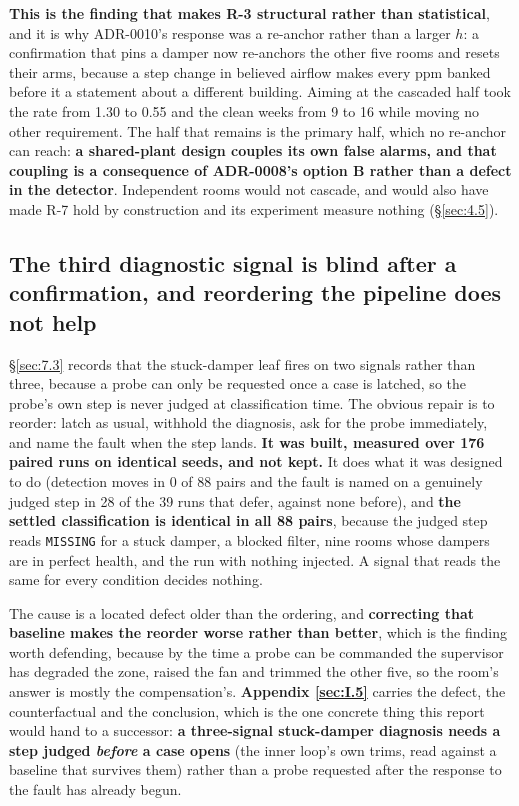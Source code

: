 \textbf{This is the finding that makes R-3 structural rather than statistical}, and it is why
ADR-0010's response was a re-anchor rather than a larger $h$: a confirmation that pins a damper now
re-anchors the other five rooms and resets their arms, because a step change in believed airflow
makes every ppm banked before it a statement about a different building. Aiming at the cascaded half
took the rate from 1.30 to 0.55 and the clean weeks from 9 to 16 while moving no other requirement.
The half that remains is the primary half, which no re-anchor can reach: \textbf{a shared-plant
design couples its own false alarms, and that coupling is a consequence of ADR-0008's option B
rather than a defect in the detector}. Independent rooms would not cascade, and would also have made
R-7 hold by construction and its experiment measure nothing (§\ref{sec:4.5}).

\subsection{The third diagnostic signal is blind after a confirmation, and reordering the
pipeline does not help}\label{sec:13.6}
§\ref{sec:7.3} records that the stuck-damper leaf fires on two signals rather than three, because a probe can
only be requested once a case is latched, so the probe's own step is never judged at
classification time. The obvious repair is to reorder: latch as usual, withhold the diagnosis, ask for the probe immediately,
and name the fault when the step lands. \textbf{It was built, measured over 176 paired runs on
identical seeds, and not kept.} It does what it was designed to do (detection moves in 0 of 88
pairs and the fault is named on a genuinely judged step in 28 of the 39 runs that defer, against none
before), and \textbf{the settled classification is identical in all 88 pairs}, because the judged
step reads \texttt{MISSING} for a stuck damper, a blocked filter, nine rooms whose dampers are in
perfect health, and the run with nothing injected. A signal that reads the same for every condition
decides nothing.

The cause is a located defect older than the ordering, and \textbf{correcting that baseline makes the
reorder worse rather than better}, which is the finding worth defending, because by the time a
probe can be commanded the supervisor has degraded the zone, raised the fan and trimmed the other
five, so the room's answer is mostly the compensation's. \textbf{Appendix \ref{sec:I.5}} carries the defect, the
counterfactual and the conclusion, which is the one concrete thing this report would hand to a
successor: \textbf{a three-signal stuck-damper diagnosis needs a step judged \emph{before} a case
opens} (the inner loop's own trims, read against a baseline that survives them) rather than a
probe requested after the response to the fault has already begun.


